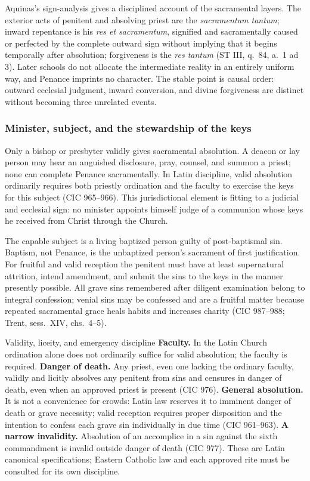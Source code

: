 Aquinas's sign-analysis gives a disciplined account of the sacramental layers. The exterior acts of penitent and absolving priest are the \emph{sacramentum tantum}; inward repentance is his \emph{res et sacramentum}, signified and sacramentally caused or perfected by the complete outward sign without implying that it begins temporally after absolution; forgiveness is the \emph{res tantum} (ST III, q.~84, a.~1 ad 3). Later schools do not allocate the intermediate reality in an entirely uniform way, and Penance imprints no character. The stable point is causal order: outward ecclesial judgment, inward conversion, and divine forgiveness are distinct without becoming three unrelated events.

\subsubsection{Minister, subject, and the stewardship of the keys}

Only a bishop or presbyter validly gives sacramental absolution. A deacon or lay person may hear an anguished disclosure, pray, counsel, and summon a priest; none can complete Penance sacramentally. In Latin discipline, valid absolution ordinarily requires both priestly ordination and the faculty to exercise the keys for this subject (CIC 965--966). This jurisdictional element is fitting to a judicial and ecclesial sign: no minister appoints himself judge of a communion whose keys he received from Christ through the Church.

The capable subject is a living baptized person guilty of post-baptismal sin. Baptism, not Penance, is the unbaptized person's sacrament of first justification. For fruitful and valid reception the penitent must have at least supernatural attrition, intend amendment, and submit the sins to the keys in the manner presently possible. All grave sins remembered after diligent examination belong to integral confession; venial sins may be confessed and are a fruitful matter because repeated sacramental grace heals habits and increases charity (CIC 987--988; Trent, sess.~XIV, chs.~4--5).

\begin{studybox}{Validity, liceity, and emergency discipline}
\textbf{Faculty.} In the Latin Church ordination alone does not ordinarily suffice for valid absolution; the faculty is required. \textbf{Danger of death.} Any priest, even one lacking the ordinary faculty, validly and licitly absolves any penitent from sins and censures in danger of death, even when an approved priest is present (CIC 976). \textbf{General absolution.} It is not a convenience for crowds: Latin law reserves it to imminent danger of death or grave necessity; valid reception requires proper disposition and the intention to confess each grave sin individually in due time (CIC 961--963). \textbf{A narrow invalidity.} Absolution of an accomplice in a sin against the sixth commandment is invalid outside danger of death (CIC 977). These are Latin canonical specifications; Eastern Catholic law and each approved rite must be consulted for its own discipline.
\end{studybox}

